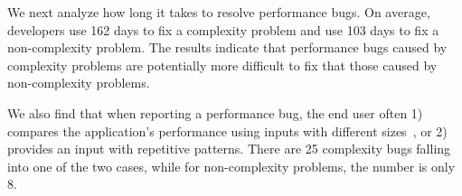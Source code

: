 


We next analyze how long it takes to resolve performance bugs. 
On average, developers use 162 days to fix a 
complexity problem and use 103 days to fix a non-complexity problem. 
The results indicate that performance bugs caused 
by complexity problems are potentially more difficult to fix
that those caused by non-complexity problems. 

We also find that 
when reporting a performance bug, the end user often 
1) compares the application's performance 
using inputs with different sizes~\cite{SongOOPSLA2014}, 
or 2) provides an input with repetitive patterns. 
There are 25 complexity bugs falling into one of the two cases, 
while for non-complexity problems, the number is only 8.


